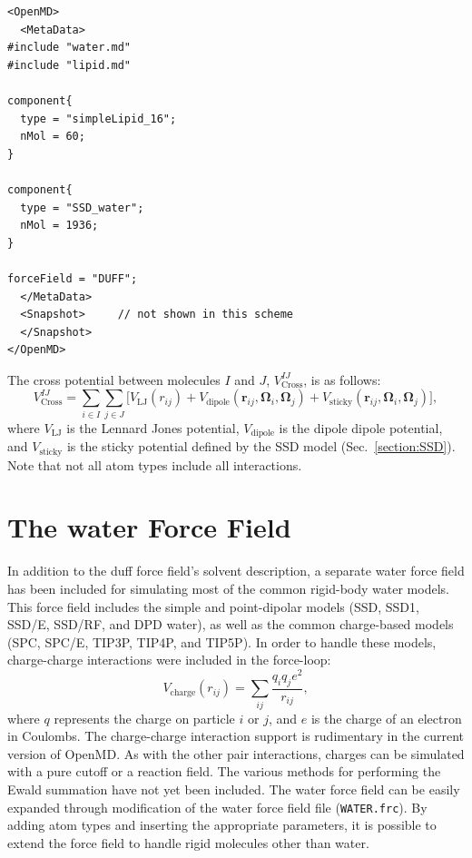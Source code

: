 \documentclass[]{book}
\begin{document}
\begin{lstlisting}[float,caption={[Invocation of {\sc duff}]A portion
of a startup file showing a simulation utilizing {\sc
duff}},label={sch:DUFF}]  
<OpenMD>
  <MetaData>
#include "water.md"
#include "lipid.md"

component{
  type = "simpleLipid_16";
  nMol = 60;
}

component{
  type = "SSD_water";
  nMol = 1936;
}

forceField = "DUFF";
  </MetaData>
  <Snapshot>     // not shown in this scheme
  </Snapshot>
</OpenMD>
\end{lstlisting}



The cross potential between molecules $I$ and $J$,
$V^{IJ}_{\text{Cross}}$, is as follows:
\begin{equation}
V^{IJ}_{\text{Cross}} = 
	\sum_{i \in I} \sum_{j \in J}
	\biggl[ V_{\text{LJ}}(r_{ij}) +  V_{\text{dipole}}
	(\mathbf{r}_{ij},\boldsymbol{\Omega}_{i},\boldsymbol{\Omega}_{j})
	+ V_{\text{sticky}}
	(\mathbf{r}_{ij},\boldsymbol{\Omega}_{i},\boldsymbol{\Omega}_{j})
	\biggr],
\label{eq:crossPotentail}
\end{equation}
where $V_{\text{LJ}}$ is the Lennard Jones potential,
$V_{\text{dipole}}$ is the dipole dipole potential, and
$V_{\text{sticky}}$ is the sticky potential defined by the SSD model
(Sec.~\ref{section:SSD}). Note that not all atom types include all
interactions.


\section{\label{section:WATER}The {\sc water} Force Field}

In addition to the {\sc duff} force field's solvent description, a
separate {\sc water} force field has been included for simulating most
of the common rigid-body water models. This force field includes the
simple and point-dipolar models (SSD, SSD1, SSD/E, SSD/RF, and DPD
water), as well as the common charge-based models (SPC, SPC/E, TIP3P,
TIP4P, and
TIP5P).\cite{liu96:new_model,Ichiye03,fennell04,Marrink01,Berendsen81,Berendsen87,Jorgensen83,Mahoney00}
In order to handle these models, charge-charge interactions were
included in the force-loop:
\begin{equation}
V_{\text{charge}}(r_{ij}) = \sum_{ij}\frac{q_iq_je^2}{r_{ij}}, 
\end{equation}
where $q$ represents the charge on particle $i$ or $j$, and $e$ is the
charge of an electron in Coulombs. The charge-charge interaction
support is rudimentary in the current version of {\sc OpenMD}.  As with
the other pair interactions, charges can be simulated with a pure
cutoff or a reaction field.  The various methods for performing the
Ewald summation have not yet been included.  The {\sc water} force
field can be easily expanded through modification of the {\sc water}
force field file ({\tt WATER.frc}). By adding atom types and inserting
the appropriate parameters, it is possible to extend the force field
to handle rigid molecules other than water.
\end{document}

